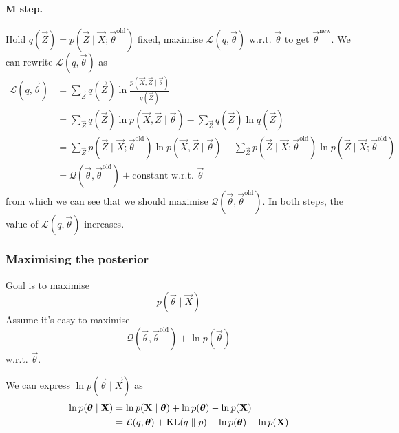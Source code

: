 \paragraph{M step.} Hold $q(\vec Z) = p(\vec Z \mid \vec X; \vec \theta^{\text{old}})$ fixed, maximise $\mathcal L\left(q, \vec \theta\right)$ w.r.t. $\vec \theta$ to get $\vec \theta^{\text{new}}$. We can rewrite $\mathcal L\left(q, \vec \theta\right)$ as
\begin{align*}
    \mathcal L\left(q, \vec \theta\right)   &= \sum_{\vec Z} q(\vec Z) \ln \frac{p(\vec X, \vec Z \mid \vec \theta)}{q(\vec Z)} \\
                                            &= \sum_{\vec Z} q(\vec Z) \ln p\left(\vec X, \vec Z \mid \vec \theta\right) - \sum_{\vec Z} q(\vec Z) \ln q(\vec Z) \\
                                            &= \sum_{\vec Z} p\left(\vec Z \mid \vec X; \vec \theta^{\text{old}}\right) \ln p\left(\vec X, \vec Z \mid \vec \theta\right) - \sum_{\vec Z} p\left(\vec Z \mid \vec X; \vec \theta^{\text{old}}\right) \ln p\left(\vec Z \mid \vec X; \vec \theta^{\text{old}}\right) \\
                                            &= \mathcal Q\left(\vec \theta, \vec \theta^{\text{old}}\right) + \text{constant w.r.t. } \vec \theta
\end{align*}
from which we can see that we should maximise $\mathcal Q\left(\vec \theta, \vec \theta^{\text{old}}\right)$. In both steps, the value of $\mathcal L(q, \vec \theta)$ increases.

\subsubsection{Maximising the posterior}
Goal is to maximise
\begin{equation*}
    p(\vec \theta \mid \vec X)
\end{equation*}
Assume it's easy to maximise
\begin{equation}
    \mathcal Q\left(\vec \theta, \vec \theta^{\text{old}}\right) + \ln p(\vec \theta)
\end{equation}
w.r.t. $\vec \theta$.

We can express $\ln p(\vec \theta \mid \vec X)$ as
\begin{align}
    \ln p(\boldsymbol{\mathbf{\theta}} \mid \boldsymbol{\mathbf{X}})  &= \ln p(\boldsymbol{\mathbf{X}} \mid \boldsymbol{\mathbf{\theta}}) + \ln p(\boldsymbol{\mathbf{\theta}}) - \ln p(\boldsymbol{\mathbf{X}}) \nonumber\\
                                    &= \mathcal L(q, \boldsymbol{\mathbf{\theta}}) + \operatorname{KL}(q \parallel p) + \ln p(\boldsymbol{\mathbf{\theta}}) - \ln p(\boldsymbol{\mathbf{X}})
\end{align}

